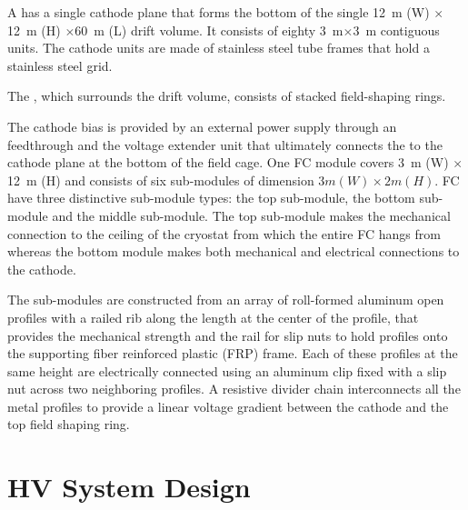 A \dpmod  
has a single cathode plane that forms the  %
bottom of the single  \SI{12}{\m} (W) $\times$\SI{12}{\m} (H) $\times$\SI{60}{\m} (L) drift volume. It consists of eighty \SI{3}{\m}$\times$\SI{3}{\m} contiguous units. 
The cathode units are made of stainless steel tube frames that hold a stainless steel grid.

The \fcage{}, which surrounds the drift volume, consists of  stacked field-shaping rings.  

The cathode bias is provided by an external \hv power supply through an \hv feedthrough and the voltage extender unit that ultimately connects the \hv to the cathode plane at the bottom of the field cage.
One FC module covers
\SI{3}{\m} (W) $\times$\SI{12}{\m} (H)
and consists of six sub-modules of dimension $3m(W)\times 2m(H)$. FC have three distinctive sub-module types: the top sub-module, the bottom sub-module and the middle sub-module.  The top sub-module makes the mechanical connection to the ceiling of the cryostat from which the entire FC hangs from whereas the bottom module makes both mechanical and electrical connections to the cathode. 


The sub-modules are constructed from an array of roll-formed aluminum open profiles with a railed rib along the length at the center of the profile, that provides the mechanical strength and the rail for slip nuts to hold profiles onto the supporting fiber reinforced plastic (FRP) frame.  Each of these profiles at the same height are electrically connected using an aluminum clip fixed with a slip nut across two neighboring profiles.  A resistive divider chain interconnects all the metal profiles to provide a linear voltage gradient between the cathode and the top field shaping ring.   


\section{HV System Design}
\label{sec:fddp-hv-design}

